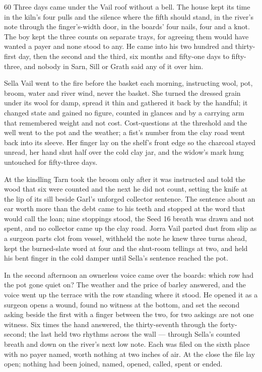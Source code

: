 \begin{CRchronicle}{60}
Three days came under the Vail roof without a bell. The house kept its time in the kiln’s four pulls and the silence where the fifth should stand, in the river’s note through the finger’s-width door, in the boards’ four nails, four and a knot. The boy kept the three counts on separate trays, for agreeing them would have wanted a payer and none stood to any. He came into his two hundred and thirty-first day, then the second and the third, six months and fifty-one days to fifty-three, and nobody in Sarn, Sill or Grath said any of it over him.

Sella Vail went to the fire before the basket each morning, instructing wool, pot, broom, water and river wind, never the basket. She turned the dressed grain under its wool for damp, spread it thin and gathered it back by the handful; it changed state and gained no figure, counted in glances and by a carrying arm that remembered weight and not cost. Cost-questions at the threshold and the well went to the pot and the weather; a fist’s number from the clay road went back into its sleeve. Her finger lay on the shelf’s front edge so the charcoal stayed unread, her hand shut half over the cold clay jar, and the widow’s mark hung untouched for fifty-three days.

At the kindling Tarn took the broom only after it was instructed and told the wood that six were counted and the next he did not count, setting the knife at the lip of its sill beside Garl’s unforged collector sentence. The sentence about an ear worth more than the debt came to his teeth and stopped at the word that would call the loan; nine stoppings stood, the Seed 16 breath was drawn and not spent, and no collector came up the clay road. Jorra Vail parted dust from slip as a surgeon parts clot from vessel, withheld the note he knew three turns ahead, kept the burned-slate word at four and the shut-room tellings at two, and held his bent finger in the cold damper until Sella’s sentence reached the pot.

In the second afternoon an ownerless voice came over the boards: which row had the pot gone quiet on? The weather and the price of barley answered, and the voice went up the terrace with the row standing where it stood. He opened it as a surgeon opens a wound, found no witness at the bottom, and set the second asking beside the first with a finger between the two, for two askings are not one witness. Six times the hand answered, the thirty-seventh through the forty-second; the last held two rhythms across the wall --- through Sella’s counted breath and down on the river’s next low note. Each was filed on the sixth place with no payer named, worth nothing at two inches of air. At the close the file lay open; nothing had been joined, named, opened, called, spent or ended.
\end{CRchronicle}
